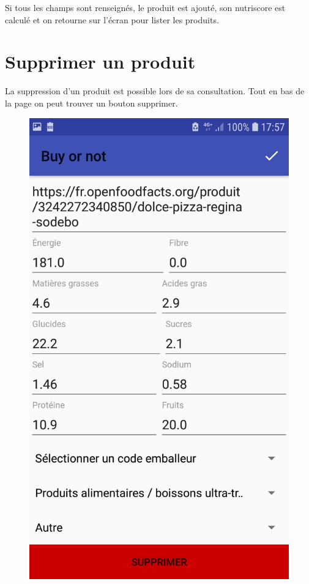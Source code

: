 \documentclass[report]{BetterDocument}
\begin{document}
	Si tous les champs sont renseignés, le produit est ajouté, son nutriscore est calculé et on retourne sur l'écran pour lister les produits.

	\section{Supprimer un produit}

	La suppression d'un produit est possible lors de sa consultation. Tout en bas de la page on peut trouver un bouton supprimer.

	\begin{figure}[H]
		\centering\includegraphics[width=0.5\paperwidth, height=0.3\paperheight, keepaspectratio]{img/supprimer.jpg}
	\end{figure}
\end{document}
